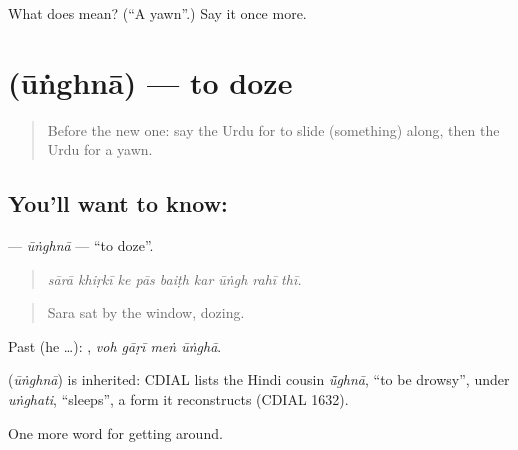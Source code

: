 \begin{tcolorbox}[breakable,colback=teal!4,colframe=teal!35!black,title={Before you move on}]
What does  mean? (\textquotedblleft{}A yawn\textquotedblright{}.) Say it once more.
\end{tcolorbox}
\section[\texorpdfstring{\ur{اونگھنا} (ūṅghnā)}{اونگھنا (ūṅghnā)}]{ (ūṅghnā) — to doze}

\label{lesson:UR-C389-unghna}



\begin{quote}
Before the new one: say the Urdu for to slide (something) along, then the Urdu for a yawn.
\end{quote}

\subsection*{You'll want to know: }
\textbf{} — \emph{ūṅghnā} — \textquotedblleft{}to doze\textquotedblright{}.

\begin{quote}
        
\end{quote}

\begin{quote}
\emph{sārā khiṛkī ke pās baiṭh kar ūṅgh rahī thī.}
\end{quote}

\begin{quote}
Sara sat by the window, dozing.
\end{quote}

Past (he …):    , \emph{voh gāṛī meṅ ūṅghā}.

\begin{cousinweb}
\textbf{} (\emph{ūṅghnā}) is inherited: CDIAL lists the Hindi cousin \emph{ū̃ghnā}, \textquotedblleft{}to be drowsy\textquotedblright{}, under \emph{uṅghati}, \textquotedblleft{}sleeps\textquotedblright{}, a form it reconstructs (CDIAL 1632).
\end{cousinweb}

\begin{grammarlens}[title={What you've built}]
One more word for getting around.
\end{grammarlens}

